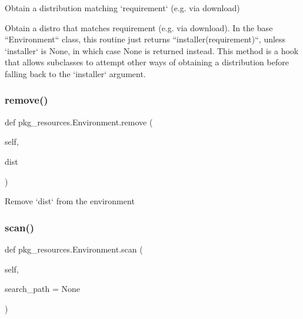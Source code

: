 \begin{DoxyVerb}Obtain a distribution matching `requirement` (e.g. via download)

Obtain a distro that matches requirement (e.g. via download).  In the
base ``Environment`` class, this routine just returns
``installer(requirement)``, unless `installer` is None, in which case
None is returned instead.  This method is a hook that allows subclasses
to attempt other ways of obtaining a distribution before falling back
to the `installer` argument.\end{DoxyVerb}
 \mbox{\label{classpkg__resources_1_1Environment_aa51b1c4f8c8c146f2fc83a833608a0d1}} 
\subsubsection{\texorpdfstring{remove()}{remove()}}
{\footnotesize\ttfamily def pkg\+\_\+resources.\+Environment.\+remove (\begin{DoxyParamCaption}\item[{}]{self,  }\item[{}]{dist }\end{DoxyParamCaption})}

\begin{DoxyVerb}Remove `dist` from the environment\end{DoxyVerb}
 \mbox{\label{classpkg__resources_1_1Environment_a2dd1caa73a329d4c50b0ab9fdec9c1d4}} 
\subsubsection{\texorpdfstring{scan()}{scan()}}
{\footnotesize\ttfamily def pkg\+\_\+resources.\+Environment.\+scan (\begin{DoxyParamCaption}\item[{}]{self,  }\item[{}]{search\+\_\+path = {\ttfamily None} }\end{DoxyParamCaption})}

